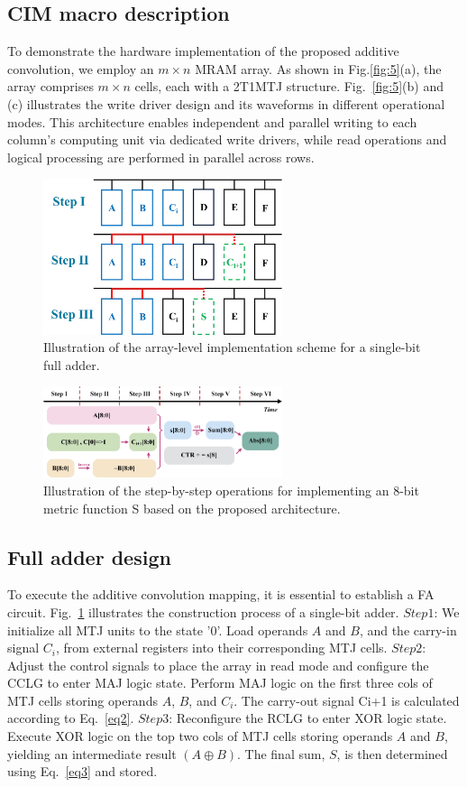 \documentclass[submit]{elex2024}%
\begin{document}
\subsection{CIM macro description} 
To demonstrate the hardware implementation of the proposed additive convolution, we employ an $m \times n$ MRAM array. As shown in Fig.\ref{fig:5}(a), the array comprises $m \times n$ cells, each with a 2T1MTJ structure. Fig.~\ref{fig:5}(b) and (c) illustrates the write driver design and its waveforms in different operational modes. This architecture enables independent and parallel writing to each column's computing unit via dedicated write drivers, while read operations and logical processing are performed in parallel across rows.
\begin{figure}[htb]
    \begin{center}
    \includegraphics[width=7cm]{Figures/fig6.pdf}
    \end{center}
    \caption{Illustration of the array-level implementation scheme for a single-bit full adder.}
    \label{fig:6}
\end{figure}
\begin{figure}[htb]
    \centering
    \includegraphics[width=7cm]{Figures/fig7.pdf}
    \caption{Illustration of the step-by-step operations for implementing an 8-bit metric function S based on the proposed architecture.}
    \label{fig:7}
\end{figure}
\subsection{Full adder design} 
To execute the additive convolution mapping, it is essential to establish a FA circuit. Fig.~\ref{fig:6} illustrates the construction process of a single-bit adder.
$Step 1$: We initialize all MTJ units to the state '0'. Load operands $A$ and $B$, and the carry-in signal $C_i$, from external registers into their corresponding MTJ cells. 
$Step 2$: Adjust the control signals to place the array in read mode and configure the CCLG to enter MAJ logic state. Perform MAJ logic on the first three cols of MTJ cells storing operands $A$, $B$, and $C_i$. The carry-out signal Ci+1 is calculated according to Eq.~\ref{eq2}.
$Step 3$: Reconfigure the RCLG to enter XOR logic state. Execute XOR logic on the top two cols of MTJ cells storing operands $A$ and $B$, yielding an intermediate result $(A\oplus B)$. The final sum, $S$, is then determined using Eq.~\ref{eq3} and stored.
\end{document}
